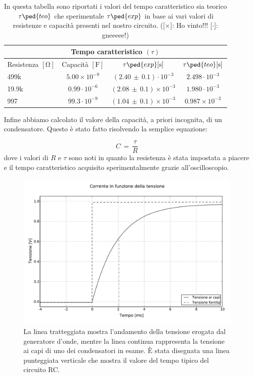 \begin{table}[H]
  \centering
  \begin{tabular}{l | c c c}
      \multicolumn{4}{c}{\textbf{Tempo caratteristico $(\tau)$}} \\
      \toprule
      Resistenza $[\si{\ohm}]$ & Capacità $[\si{\farad}]$ & $\tau\ped{exp} [\si{\second}]$ & $\tau\ped{teo} [\si{\second}]$ \\
      \midrule
      499k   &  $5.00\times10^{-9}$ 	& $(2.40\,\pm\,0.1)\cdot10^{-3}$ 	& $2.498\cdot10^{-3}$ \\
      19.9k  &  $0.99\cdot10^{-6}$ 	& $ (2.08\,\pm\,0.1)\times10^{-3}$ 	& $1.980\cdot10^{-3}$ \\
      997    &  $99.3\cdot10^{-9}$ 	& $ (1.04\,\pm\,0.1)\times10^{-3}$ 	& $0.987\times10^{-3}$ \\
      \bottomrule
  \end{tabular}
  \caption{In questa tabella sono riportati i valori del tempo caratteristico sia teorico $\tau\ped{teo}$ che sperimentale $\tau\ped{exp}$ in base ai vari valori di resistenze e capacità presenti nel nostro circuito. ([$\times$]: Ho vinto!!! [$\cdot$]: gneeeee!)}
\end{table}

Infine abbiamo calcolato il valore della capacità, a priori incognita, di un condensatore. Questo è stato fatto risolvendo la semplice equazione:

\begin{equation}
	C \,=\, \frac{\tau}{R}
\end{equation}
%
dove i valori di $R$ e $\tau$ sono noti in quanto la resistenza è stata impostata a piacere e il tempo caratteristico acquisito sperimentalmente grazie all'oscilloscopio.

\begin{figure}
    \includegraphics[width=140mm]{fig.pdf}
    \caption{La linea tratteggiata mostra l'andamento della tensione erogata dal generatore d'onde, mentre la linea continua
      rappresenta la tensione ai capi di uno dei condensatori in esame. È stata disegnata una linea punteggiata verticale che mostra il
      valore del tempo tipico del circuito RC.}
\end{figure}
